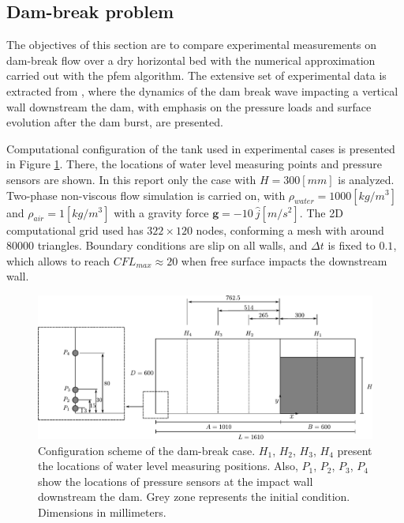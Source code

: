 \subsection{Dam-break problem}%

The objectives of this section are to compare experimental measurements on dam-break flow over a dry horizontal bed with the numerical approximation carried out with the pfem algorithm. The extensive set of experimental data is extracted from \cite{Lobovsky13}, where the dynamics of the dam break wave impacting a vertical wall downstream the dam, with emphasis on the pressure loads and surface evolution after the dam burst, are presented.

Computational configuration of the tank used in experimental cases is presented in Figure \ref{fg:dambreak-config}. There, the locations of water level measuring points and pressure sensors are shown. In this report only the case with $H=300[mm]$ is analyzed. Two-phase non-viscous flow simulation is carried on, with $\rho_{water}=1000[kg/m^3]$ and $\rho_{air}=1[kg/m^3]$ with a gravity force $\mathbf{g}=-10\ \hat{j} [m/s^2]$. The 2D computational grid used has $322\times120$ nodes, conforming a mesh with around $80000$ triangles. Boundary conditions are slip on all walls, and $\Delta t$ is fixed to $0.1$, which allows to reach $CFL_{max}\approx20$ when free surface impacts the downstream wall.

\begin{figure}[htbp]
  \begin{center}
      \includegraphics[width=\columnwidth]{images/dam_break_config.pdf}
  \end{center}
  \caption{\label{fg:dambreak-config} Configuration scheme of the dam-break case. $H_1$, $H_2$, $H_3$, $H_4$ present the locations of water level measuring positions. Also, $P_1$, $P_2$, $P_3$, $P_4$ show the locations of pressure sensors at the impact wall downstream the dam. Grey zone represents the initial condition. Dimensions in millimeters.}
\end{figure}

